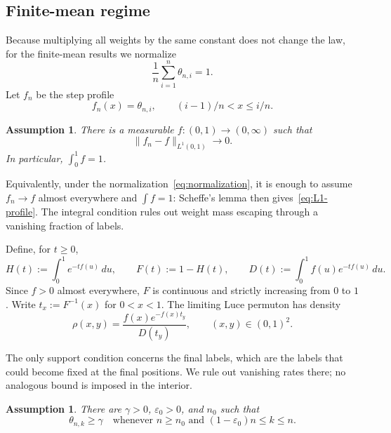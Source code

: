 \documentclass[11pt]{article}
\theoremstyle{remark}
\theoremstyle{plain}
\newtheorem{assumption}[theorem]{Assumption}
\newcommand{\eps}{\varepsilon}
\begin{document}
\subsection{Finite-mean regime}

Because multiplying all weights by the same constant does not change the
law, for the finite-mean results we normalize
\begin{equation}\label{eq:normalization}
 \frac1n\sum_{i=1}^n\theta_{n,i}=1.
\end{equation}
Let $f_n$ be the step profile
\begin{equation}\label{eq:step-profile}
 f_n(x)=\theta_{n,i},\qquad (i-1)/n<x\le i/n.
\end{equation}

\begin{assumption}\label{ass:profile}
There is a measurable $f:(0,1)\to(0,\infty)$ such that
\begin{equation}\label{eq:L1-profile}
 \lVert f_n-f\rVert_{L^1(0,1)}\longrightarrow0.
\end{equation}
In particular, $\int_0^1f=1$.
\end{assumption}

Equivalently, under the normalization~\eqref{eq:normalization}, it is enough
to assume $f_n\to f$ almost everywhere and $\int f=1$: Scheffe's lemma then
gives~\eqref{eq:L1-profile}.  The integral condition rules out weight mass
escaping through a vanishing fraction of labels.

Define, for $t\ge0$,
\begin{equation}\label{eq:HFD}
 H(t):=\int_0^1e^{-t f(u)}\,du,\qquad
 F(t):=1-H(t),\qquad
 D(t):=\int_0^1 f(u)e^{-t f(u)}\,du.
\end{equation}
Since $f>0$ almost everywhere, $F$ is continuous and strictly increasing from
$0$ to $1$.  Write $t_x:=F^{-1}(x)$ for $0<x<1$.  The limiting Luce permuton
has density
\begin{equation}\label{eq:rho}
 \rho(x,y)=
 \frac{f(x)e^{-f(x)t_y}}{D(t_y)},
 \qquad (x,y)\in(0,1)^2.
\end{equation}

The only support condition concerns the final labels, which are the labels
that could become fixed at the final positions.  We rule out vanishing rates
there; no analogous bound is imposed in the interior.

\begin{assumption}\label{ass:endpoint}
There are $\gamma>0$, $\eps_0>0$, and $n_0$ such that
\begin{equation}\label{eq:endpoint-lower}
 \theta_{n,k}\ge\gamma
 \quad\text{whenever }n\ge n_0\text{ and }(1-\eps_0)n\le k\le n.
\end{equation}
\end{assumption}
\end{document}

